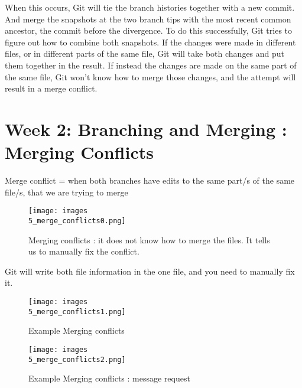 \documentclass[11pt, onecolumn]{article}
\begin{document}
When this occurs, Git will tie the branch histories together with a new commit.
And merge the snapshots at the two branch tips with the most recent common ancestor, the commit before the divergence.
To do this successfully, Git tries to figure out how to combine both snapshots.
If the changes were made in different files, or in different parts of the same file, Git will take both changes and put them together in the result.
If instead the changes are made on the same part of the same file, Git won't know how to merge those changes, and the attempt will result in a merge conflict. 


\section{Week 2: Branching and Merging : Merging Conflicts}

Merge conflict = when both branches have edits to the same part/s of the same file/s, that we are trying to merge

\begin{figure}[h]
\begin{center}
\texttt{[image: images\\5\_merge\_conflicts0.png]}
\end{center}
\caption{Merging conflicts : it does not know how to merge the files. It tells us to manually fix the conflict.}
\label{5_merge_conflicts0}
\end{figure}

Git will write both file information in the one file, and you need to manually fix it.

\begin{figure}[h]
\begin{center}
\texttt{[image: images\\5\_merge\_conflicts1.png]}
\end{center}
\caption{Example Merging conflicts}
\label{5_merge_conflicts1}
\end{figure}

\begin{figure}[h]
\begin{center}
\texttt{[image: images\\5\_merge\_conflicts2.png]}
\end{center}
\caption{Example Merging conflicts : message request}
\label{5_merge_conflicts2}
\end{figure}
\end{document}

